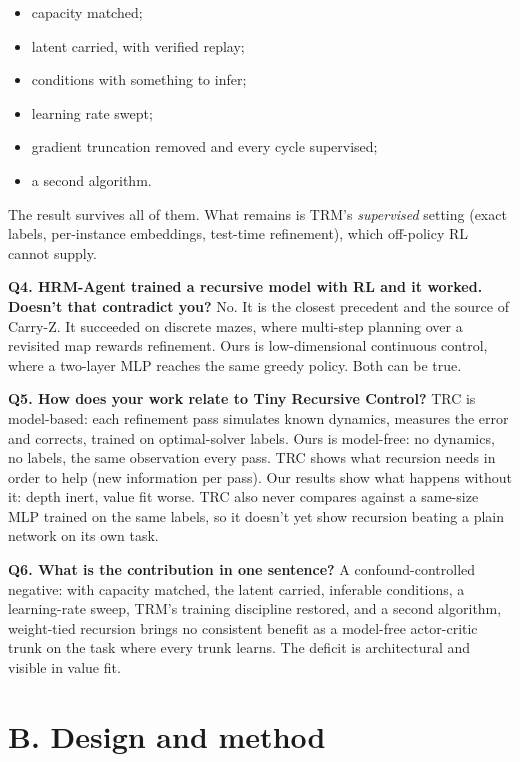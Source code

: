 \documentclass[11pt]{article}
\begin{document}
\begin{itemize}
\item capacity matched;
\item latent carried, with verified replay;
\item conditions with something to infer;
\item learning rate swept;
\item gradient truncation removed and every cycle supervised;
\item a second algorithm.
\end{itemize}



The result survives all of them. What remains is TRM's \emph{supervised} setting (exact labels, per-instance embeddings, test-time refinement), which off-policy RL cannot supply.



\textbf{Q4. HRM-Agent trained a recursive model with RL and it worked. Doesn't that contradict you?} No. It is the closest precedent and the source of Carry-Z. It succeeded on discrete mazes, where multi-step planning over a revisited map rewards refinement. Ours is low-dimensional continuous control, where a two-layer MLP reaches the same greedy policy. Both can be true.



\textbf{Q5. How does your work relate to Tiny Recursive Control?} TRC is model-based: each refinement pass simulates known dynamics, measures the error and corrects, trained on optimal-solver labels. Ours is model-free: no dynamics, no labels, the same observation every pass. TRC shows what recursion needs in order to help (new information per pass). Our results show what happens without it: depth inert, value fit worse. TRC also never compares against a same-size MLP trained on the same labels, so it doesn't yet show recursion beating a plain network on its own task.



\textbf{Q6. What is the contribution in one sentence?} A confound-controlled negative: with capacity matched, the latent carried, inferable conditions, a learning-rate sweep, TRM's training discipline restored, and a second algorithm, weight-tied recursion brings no consistent benefit as a model-free actor-critic trunk on the task where every trunk learns. The deficit is architectural and visible in value fit.



\section*{B. Design and method}
\end{document}

